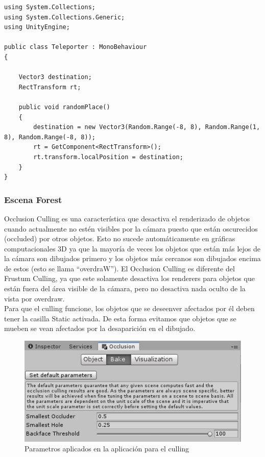 \lstset{language=[sharp]C, breaklines=true, basicstyle=\footnotesize}
\begin{lstlisting}[frame=single, caption={Teleporter.cs}]
using System.Collections;
using System.Collections.Generic;
using UnityEngine;

public class Teleporter : MonoBehaviour
{

    Vector3 destination;
    RectTransform rt;
    
    public void randomPlace()
    {
        destination = new Vector3(Random.Range(-8, 8), Random.Range(1, 8), Random.Range(-8, 8));
        rt = GetComponent<RectTransform>();
        rt.transform.localPosition = destination;
    }
}
\end{lstlisting}

	\subsubsection{Escena Forest}
\quad Occlusion Culling es una característica que desactiva el renderizado de objetos cuando actualmente no estén visibles por la cámara puesto que están oscurecidos (occluded) por otros objetos. Esto no sucede automáticamente en gráficas computacionales 3D ya que la mayoría de veces los objetos que están más lejos de la cámara son dibujados primero y los objetos más cercanos son dibujados encima de estos (esto se llama “overdraW”). El Occlusion Culling es diferente del Frustum Culling, ya que este solamente desactiva los renderers para objetos que están fuera del área visible de la cámara, pero no desactiva nada oculto de la vista por overdraw.\\

\quad Para que el culling funcione, los objetos que se deseenver afectados por él deben tener la casilla Static activada. De esta forma evitamos que objetos que se mueben se vean afectados por la desaparición en el dibujado.\\

\begin{figure}[htb]
	\centering
	\includegraphics[width=1\textwidth]{./imagenes/cullingdata}
	\caption{Parametros aplicados en la aplicación para el culling}
\end{figure}

